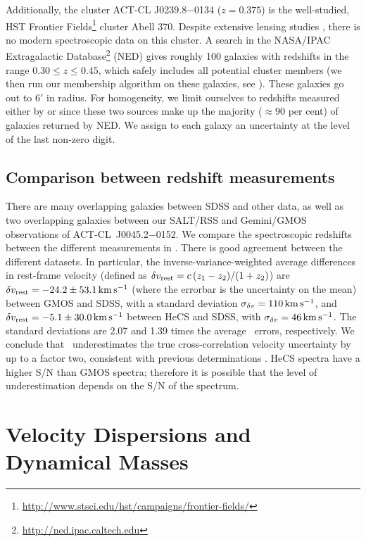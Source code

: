 Additionally, the cluster ACT-CL J0239.8$-$0134 ($z=0.375$) is the well-studied, HST Frontier 
Fields\footnote{\url{http://www.stsci.edu/hst/campaigns/frontier-fields/}} cluster Abell 370. 
Despite extensive lensing studies 
\citep[e.g.][]{medezinski10,richard10,hoekstra12,vonderlinden14_lensing}, there is no modern spectroscopic 
data on this cluster. A search in the NASA/IPAC Extragalactic 
Database\footnote{\url{http://ned.ipac.caltech.edu}} (NED) gives roughly 100 galaxies with 
redshifts in the range $0.30 \leq z \leq 0.45$, which safely includes all potential cluster 
members (we then run our membership algorithm on these galaxies, see ). These 
galaxies go out to $6'$ in radius. For homogeneity, we limit ourselves to redshifts measured 
either by \cite{soucail88} or \cite{dressler99} since these two sources make up the majority 
($\approx90$ per cent) of galaxies returned by NED. We assign to each galaxy an uncertainty at the 
level 
of the last non-zero digit.

\subsection{Comparison between redshift measurements}
\label{s:compare_measurements}

There are many overlapping galaxies between SDSS and other data, as well as two overlapping 
galaxies between our SALT/RSS and Gemini/GMOS observations of ACT-CL~J0045.2$-$0152. We compare 
the spectroscopic redshifts between the different measurements in . 
There is good agreement between the different datasets. In particular, the 
inverse-variance-weighted average differences in rest-frame velocity (defined as $\delta v_{\rm 
rest}=c\,(z_1-z_2)/(1+z_2)$) are $\delta v_{\rm rest}=-24.2\pm53.1\,\mathrm{km\,s^{-1}}$ (where 
the errorbar is the uncertainty on the mean) between GMOS and SDSS, with a standard deviation 
$\sigma_{\delta v}=110\,\mathrm{km\,s^{-1}}$, and $\delta v_{\rm 
rest}=-5.1\pm30.0\,\mathrm{km\,s^{-1}}$ between HeCS and SDSS, with $\sigma_{\delta 
v}=46\,\mathrm{km\,s^{-1}}$. The standard deviations are 2.07 and 1.39 times the average \xcsao\ 
errors, respectively. We conclude that \xcsao\ underestimates the true cross-correlation velocity 
uncertainty by up to a factor two, consistent with previous determinations 
\citep[e.g.,][]{quintana00,boschin04,barrena09}. HeCS spectra have a higher S/N than GMOS spectra; 
therefore it is possible that the level of underestimation depends on the S/N of the spectrum.


\section{Velocity Dispersions and Dynamical Masses}
\label{s:masses}

